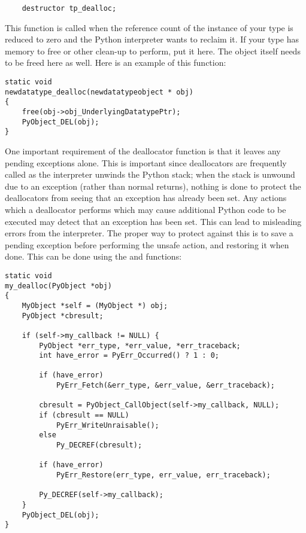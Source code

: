 
\begin{verbatim}
    destructor tp_dealloc;
\end{verbatim}

This function is called when the reference count of the instance of
your type is reduced to zero and the Python interpreter wants to
reclaim it.  If your type has memory to free or other clean-up to
perform, put it here.  The object itself needs to be freed here as
well.  Here is an example of this function:

\begin{verbatim}
static void
newdatatype_dealloc(newdatatypeobject * obj)
{
    free(obj->obj_UnderlyingDatatypePtr);
    PyObject_DEL(obj);
}
\end{verbatim}

One important requirement of the deallocator function is that it
leaves any pending exceptions alone.  This is important since
deallocators are frequently called as the interpreter unwinds the
Python stack; when the stack is unwound due to an exception (rather
than normal returns), nothing is done to protect the deallocators from
seeing that an exception has already been set.  Any actions which a
deallocator performs which may cause additional Python code to be
executed may detect that an exception has been set.  This can lead to
misleading errors from the interpreter.  The proper way to protect
against this is to save a pending exception before performing the
unsafe action, and restoring it when done.  This can be done using the
 and
 functions:

\begin{verbatim}
static void
my_dealloc(PyObject *obj)
{
    MyObject *self = (MyObject *) obj;
    PyObject *cbresult;

    if (self->my_callback != NULL) {
        PyObject *err_type, *err_value, *err_traceback;
        int have_error = PyErr_Occurred() ? 1 : 0;

        if (have_error)
            PyErr_Fetch(&err_type, &err_value, &err_traceback);

        cbresult = PyObject_CallObject(self->my_callback, NULL);
        if (cbresult == NULL)
            PyErr_WriteUnraisable();
        else
            Py_DECREF(cbresult);

        if (have_error)
            PyErr_Restore(err_type, err_value, err_traceback);

        Py_DECREF(self->my_callback);
    }
    PyObject_DEL(obj);
}
\end{verbatim}


